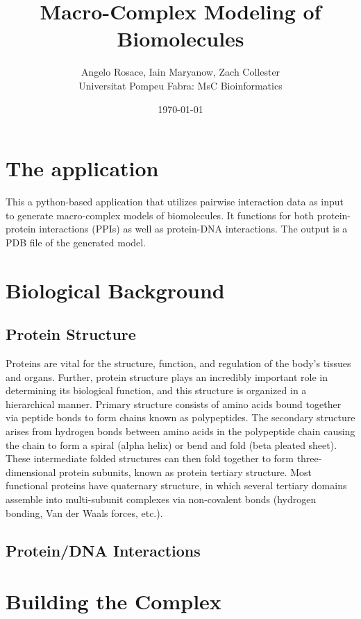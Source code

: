 \documentclass[a4paper,12pt]{article}
\begin{document}
\title{Macro-Complex Modeling of Biomolecules}
\author{Angelo Rosace, Iain Maryanow, Zach Collester \\  Universitat Pompeu Fabra: MsC Bioinformatics}
\date{\today}
\maketitle


\section{The application}
This a python-based application that utilizes pairwise interaction data as input to generate macro-complex models of biomolecules. It functions for both protein-protein interactions (PPIs) as well as protein-DNA interactions. The output is a PDB file of the generated model.

\section{Biological Background}
\subsection{Protein Structure}
Proteins are vital for the structure, function, and regulation of the body’s tissues and organs. Further, protein structure plays an incredibly important role in determining its biological function, and this structure is organized in a hierarchical manner. Primary structure consists of amino acids bound together via peptide bonds to form chains known as polypeptides. The secondary structure arises from hydrogen bonds between amino acids in the polypeptide chain causing the chain to form a spiral (alpha helix) or bend and fold (beta pleated sheet). These intermediate folded structures can then fold together to form three-dimensional protein subunits, known as protein tertiary structure. Most functional proteins have quaternary structure, in which several tertiary domains assemble into multi-subunit complexes via non-covalent bonds (hydrogen bonding, Van der Waals forces, etc.). 
\subsection{Protein/DNA Interactions}

\section{Building the Complex}
\end{document}
